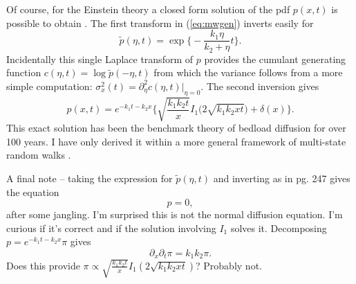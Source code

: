 \documentclass[11pt]{article}
\newcommand\be{\begin{equation}} %
\newcommand\ee{\end{equation}}   %
\begin{document}
Of course, for the Einstein theory a closed form solution of the pdf $p(x,t)$ is possible to obtain \citep[e.g.][]{Einstein1937, Hubbell1964, Daly2006,Daly2019}.
The first transform in (\ref{eq:mwgen}) inverts easily for 
\be \tilde{p}(\eta,t) = \exp\Big\{-\frac{k_1\eta }{k_2 + \eta} t\Big\}.\ee
Incidentally this single Laplace transform of $p$ provides the cumulant generating function $c(\eta,t) = \log \tilde{p}(-\eta,t)$ from which the variance follows from a more simple computation: $\sigma_x^2(t) = \partial_\eta^2 c(\eta,t)\big|_{\eta=0}.$
The second inversion gives \citep[e.g.][]{Daly2019}
\be p(x,t) = e^{-k_1 t -k_2 x}\Big\{ \sqrt{\frac{k_1 k_2 t}{ x}} I_1\Big( 2\sqrt{k_1k_2 x t}\Big) + \delta(x) \Big\} .\ee
This exact solution has been the benchmark theory of bedload diffusion for over 100 years. I have only derived it within a more general framework of multi-state random walks \citep[e.g.][]{Weiss1994}.

A final note -- taking the expression for $\tilde{p}(\eta,t)$ and inverting as in \citet{Weiss1994} pg. 247 gives the equation 
\be [k_1 \partial_x + k_2\partial_t + \partial_x \partial_t] p = 0, \ee
after some jangling.
I'm surprised this is not the normal diffusion equation.
I'm curious if it's correct and if the solution involving $I_1$ solves it.
Decomposing $p = e^{-k_1 t - k_2 x}\pi$ gives 
\be \partial_x \partial_t \pi = k_1 k_2\pi.\ee
Does this provide $\pi \propto \sqrt{\frac{k_1k_2t}{x}}I_1(2\sqrt{k_1k_2xt})$?
Probably not.
\end{document}
